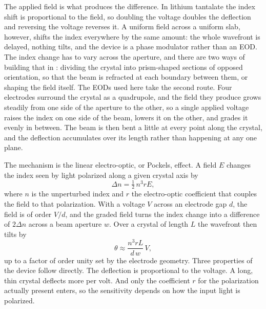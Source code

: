 \documentclass{article}
\begin{document}
The applied field is what produces the difference. In lithium tantalate the index shift is
proportional to the field, so doubling the voltage doubles the deflection and reversing the
voltage reverses it. A uniform field across a uniform slab, however, shifts the index everywhere
by the same amount: the whole wavefront is delayed, nothing tilts, and the device is a phase
modulator rather than an EOD. The index change has to vary across the aperture, and there are two
ways of building that in \cite{romerElectroopticAcoustoopticLaser2014}: dividing the crystal into
prism-shaped sections of opposed orientation, so that the beam is refracted at each boundary
between them, or shaping the field itself. The EODs used here take the second route. Four
electrodes surround the crystal as a quadrupole, and the field they produce grows steadily from one
side of the aperture to the other, so a single applied voltage raises the index on one side of the
beam, lowers it on the other, and grades it evenly in between. The beam is then bent a little at
every point along the crystal, and the deflection accumulates over its length rather than
happening at any one plane.

The mechanism is the linear electro-optic, or Pockels, effect. A field $E$ changes the index seen
by light polarized along a given crystal axis by
\begin{equation}
    \Delta n = \tfrac{1}{2}\, n^3 r E ,
\end{equation}
where $n$ is the unperturbed index and $r$ the electro-optic coefficient that couples the field to
that polarization. With a voltage $V$ across an electrode gap $d$, the field is of order $V/d$, and
the graded field turns the index change into a difference of $2\Delta n$ across a beam aperture $w$. Over
a crystal of length $L$ the wavefront then tilts by
\begin{equation}
    \theta \approx \frac{n^3 r L}{d\, w}\, V ,
\end{equation}
up to a factor of order unity set by the electrode geometry. Three properties of the device
follow directly. The deflection is proportional to the voltage. A long, thin crystal deflects
more per volt. And only the coefficient $r$ for the polarization actually present enters, so the
sensitivity depends on how the input light is polarized.
\end{document}
